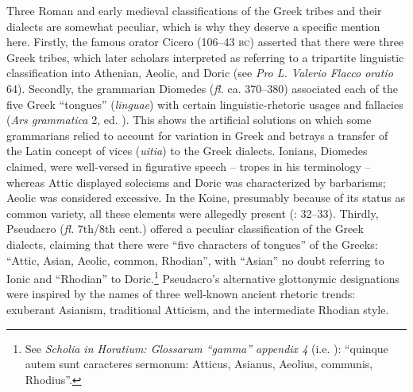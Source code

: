 Three Roman and early medieval classifications of the Greek tribes and their dialects are somewhat peculiar, which is why they deserve a specific mention here. Firstly, the famous orator Cicero (106–43 \textsc{bc}) asserted that there were three Greek tribes, which later scholars interpreted as referring to a tripartite linguistic classification into Athenian, Aeolic, and Doric (see \textit{Pro L. Valerio Flacco oratio} 64). Secondly, the grammarian Diomedes (\textit{fl.} ca. 370–380) associated each of the five Greek “tongues” (\textit{linguae}) with certain linguistic-rhetoric usages and fallacies (\textit{Ars grammatica} 2, ed. \citealt[440]{Keil1857}). This shows the artificial solutions on which some grammarians relied to account for variation in Greek and betrays a transfer of the Latin concept of vices (\textit{uitia}) to the Greek dialects. Ionians, Diomedes claimed, were well-versed in figurative speech – tropes in his terminology – whereas Attic displayed solecisms and Doric was characterized by barbarisms; Aeolic was considered excessive. In the Koine, presumably because of its status as common variety, all these elements were allegedly present (\citealt{Consani1991}: 32–33). Thirdly, Pseudacro (\textit{fl.} 7th/8th cent.) offered a peculiar classification of the Greek dialects, claiming that there were “five characters of tongues” of the Greeks: “Attic, Asian, Aeolic, common, Rhodian”, with “Asian” no doubt referring to Ionic and “Rhodian” to Doric.\footnote{See \textit{Scholia in Horatium: Glossarum “gamma” appendix 4} (i.e. \citealt[385]{Pseudacro1904}): “quinque autem sunt caracteres sermonum: Atticus, Asianus, Aeolius, communis, Rhodius”.} Pseudacro’s alternative glottonymic designations were inspired by the names of three well-known ancient rhetoric trends: exuberant Asianism, traditional Atticism, and the intermediate Rhodian style.

